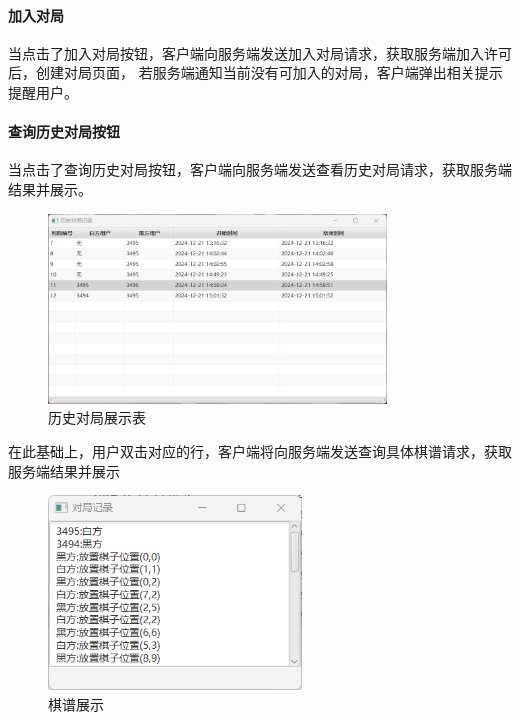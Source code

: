 \documentclass[utf8]{article}
\begin{document}
\paragraph{加入对局}
当点击了加入对局按钮，客户端向服务端发送加入对局请求，获取服务端加入许可后，创建对局页面，
若服务端通知当前没有可加入的对局，客户端弹出相关提示提醒用户。
\paragraph{查询历史对局按钮}
当点击了查询历史对局按钮，客户端向服务端发送查看历史对局请求，获取服务端结果并展示。
\begin{figure}[H]
    \centering
    \includegraphics[width=0.8\textwidth]{pictures/9}
    \caption{历史对局展示表}
\end{figure}
在此基础上，用户双击对应的行，客户端将向服务端发送查询具体棋谱请求，获取服务端结果并展示
\begin{figure}[H]
    \centering
    \includegraphics[width=0.6\textwidth]{pictures/10}
    \caption{棋谱展示}
\end{figure}
\end{document}
